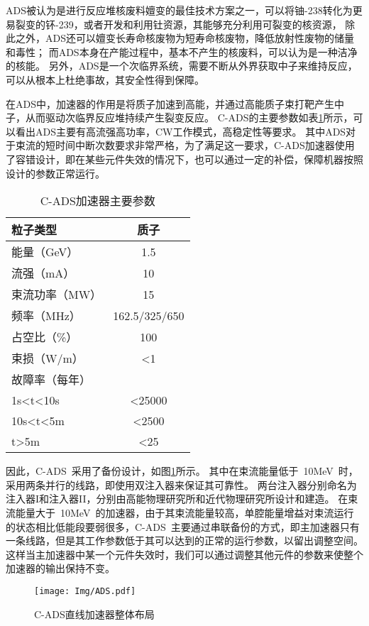 ADS被认为是进行反应堆核废料嬗变的最佳技术方案之一，可以将铀-238转化为更易裂变的钚-239，或者开发和利用钍资源，其能够充分利用可裂变的核资源，
除此之外，ADS还可以嬗变长寿命核废物为短寿命核废物，降低放射性废物的储量和毒性；
而ADS本身在产能过程中，基本不产生的核废料，可以认为是一种洁净的核能。
另外，ADS是一个次临界系统，需要不断从外界获取中子来维持反应，可以从根本上杜绝事故，其安全性得到保障。

在ADS中，加速器的作用是将质子加速到高能，并通过高能质子束打靶产生中子，从而驱动次临界反应堆持续产生裂变反应。
C-ADS的主要参数如表\ref{tab:C_ADS_parameter}所示\cite{zhihuili2011ADS}，可以看出ADS主要有高流强高功率，CW工作模式，高稳定性等要求。
其中ADS对于束流的短时间中断次数要求非常严格，为了满足这一要求，C-ADS加速器使用了容错设计，即在某些元件失效的情况下，也可以通过一定的补偿，保障机器按照设计的参数正常运行。

\begin{table}[!htb]
  \centering
  \begin{tabular}{>{\small}l|c}
    \hline
    粒子类型              &质子  \\
    \hline
    能量（GeV）           &1.5   \\
    \hline
    流强（mA）            &10    \\
    \hline
    束流功率（MW）        &15    \\
    \hline
    频率（MHz）           &162.5/325/650  \\
    \hline
    占空比（\%）          &100   \\
    \hline
    束损（W/m）           &<1    \\
    \hline
    故障率（每年）        & \\
    \qquad 1s<t<10s        & <25000 \\
    \qquad 10s<t<5m        & <2500  \\
    \qquad t>5m            & <25    \\
    \hline
  \end{tabular}
  \caption{C-ADS加速器主要参数}
  \label{tab:C_ADS_parameter}
\end{table}

因此，C-ADS~采用了备份设计，如图\ref{fig:ADS_two_injector}所示\cite{fang2014physics,fang2016instability}。
其中在束流能量低于~10MeV~时，采用两条并行的线路，即使用双注入器来保证其可靠性。
两台注入器分别命名为注入器I和注入器II，分别由高能物理研究所和近代物理研究所设计和建造。
在束流能量大于~10MeV~的加速器，由于其束流能量较高，单腔能量增益对束流运行的状态相比低能段要弱很多，C-ADS~主要通过串联备份的方式，即主加速器只有一条线路，但是其工作参数低于其可以达到的正常的运行参数，以留出调整空间。
这样当主加速器中某一个元件失效时，我们可以通过调整其他元件的参数来使整个加速器的输出保持不变。


\begin{figure}[!htb]
    \centering
    \texttt{[image: Img/ADS.pdf]}
    \caption{C-ADS直线加速器整体布局}
    \label{fig:ADS_two_injector}
\end{figure}



